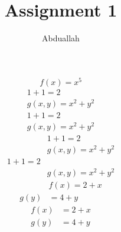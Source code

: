 \documentclass{article}
\title{Assignment 1}
\author{Abduallah}
\begin{document}
	\maketitle
	\begin{equation}
		f(x)=x^5	
	\end{equation}
   \begin{align}
   	1+1=2\\%
   	g(x,y)=x^2+y^2
   \end{align}
   \begin{align*}
   1+1=2\\
   g(x,y)=x^2+y^2
   \end{align*}
   \begin{align}
   &1+1=2\\
   &g(x,y)=x^2+y^2\\
   1+1=2&\\                %
   &g(x,y)=x^2+y^2         %
   \end{align}
   \begin{align}
   	&f(x)=2+x\\
   	g(y)&=4+y   	
   \end{align}
   \begin{align}
   f(x)&=2+x\\
   g(y)&=4+y   	
   \end{align} 
   
\end{document}
